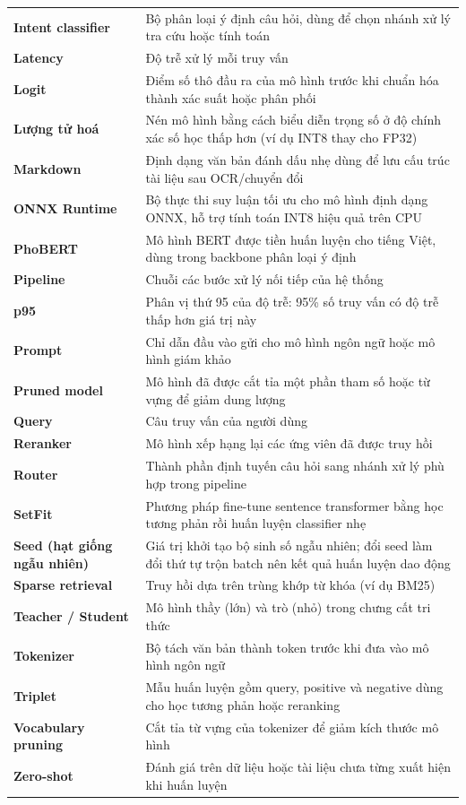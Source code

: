 \documentclass[../DoAn.tex]{subfiles}
\begin{document}
\begin{longtable}{>{\raggedright\arraybackslash}p{4cm} >{\raggedright\arraybackslash}p{10cm}}
	\textbf{Intent classifier} & Bộ phân loại ý định câu hỏi, dùng để chọn nhánh xử lý tra cứu hoặc tính toán \\
	\textbf{Latency} & Độ trễ xử lý mỗi truy vấn \\
	\textbf{Logit} & Điểm số thô đầu ra của mô hình trước khi chuẩn hóa thành xác suất hoặc phân phối \\
	\textbf{Lượng tử hoá} & Nén mô hình bằng cách biểu diễn trọng số ở độ chính xác số học thấp hơn (ví dụ INT8 thay cho FP32) \\
	\textbf{Markdown} & Định dạng văn bản đánh dấu nhẹ dùng để lưu cấu trúc tài liệu sau OCR/chuyển đổi \\
	\textbf{ONNX Runtime} & Bộ thực thi suy luận tối ưu cho mô hình định dạng ONNX, hỗ trợ tính toán INT8 hiệu quả trên CPU \\
	\textbf{PhoBERT} & Mô hình BERT được tiền huấn luyện cho tiếng Việt, dùng trong backbone phân loại ý định \\
	\textbf{Pipeline} & Chuỗi các bước xử lý nối tiếp của hệ thống \\
	\textbf{p95} & Phân vị thứ 95 của độ trễ: 95\% số truy vấn có độ trễ thấp hơn giá trị này \\
	\textbf{Prompt} & Chỉ dẫn đầu vào gửi cho mô hình ngôn ngữ hoặc mô hình giám khảo \\
	\textbf{Pruned model} & Mô hình đã được cắt tỉa một phần tham số hoặc từ vựng để giảm dung lượng \\
	\textbf{Query} & Câu truy vấn của người dùng \\
	\textbf{Reranker} & Mô hình xếp hạng lại các ứng viên đã được truy hồi \\
	\textbf{Router} & Thành phần định tuyến câu hỏi sang nhánh xử lý phù hợp trong pipeline \\
	\textbf{SetFit} & Phương pháp fine-tune sentence transformer bằng học tương phản rồi huấn luyện classifier nhẹ \\
	\textbf{Seed (hạt giống ngẫu nhiên)} & Giá trị khởi tạo bộ sinh số ngẫu nhiên; đổi seed làm đổi thứ tự trộn batch nên kết quả huấn luyện dao động \\
	\textbf{Sparse retrieval} & Truy hồi dựa trên trùng khớp từ khóa (ví dụ BM25) \\
	\textbf{Teacher / Student} & Mô hình thầy (lớn) và trò (nhỏ) trong chưng cất tri thức \\
	\textbf{Tokenizer} & Bộ tách văn bản thành token trước khi đưa vào mô hình ngôn ngữ \\
	\textbf{Triplet} & Mẫu huấn luyện gồm query, positive và negative dùng cho học tương phản hoặc reranking \\
	\textbf{Vocabulary pruning} & Cắt tỉa từ vựng của tokenizer để giảm kích thước mô hình \\
	\textbf{Zero-shot} & Đánh giá trên dữ liệu hoặc tài liệu chưa từng xuất hiện khi huấn luyện \\
	\hline
\end{longtable}
\endgroup
\end{document}
